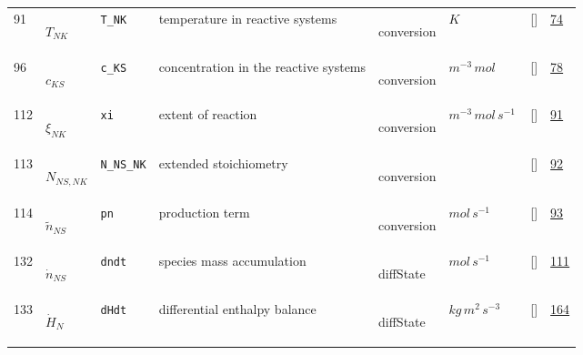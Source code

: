 \begin{longtable}{|p{1cm}|p{3cm}|p{3cm}|p{7cm}|p{3.0cm}|p{3cm}|p{2cm}|p{1cm}|}
                 \\
    91
             & \hypertarget{"v:91"}{ $ {T}_{{N K}} $}
             & \verb|T_NK|
             & temperature in reactive systems
             & \begin{lay}conversion \end{lay}
             & $ K \, $
             & []
             & \hyperlink{"e:74"}{ 74 }
                 \\
    96
             & \hypertarget{"v:96"}{ $ {c}_{{K S}} $}
             & \verb|c_KS|
             & concentration in the reactive systems
             & \begin{lay}conversion \end{lay}
             & $ m^{-3} \,mol \, $
             & []
             & \hyperlink{"e:78"}{ 78 }
                 \\
    112
             & \hypertarget{"v:112"}{ $ {\xi}_{{N K}} $}
             & \verb|xi|
             & extent of reaction
             & \begin{lay}conversion \end{lay}
             & $ m^{-3} \,mol \,s^{-1} \, $
             & []
             & \hyperlink{"e:91"}{ 91 }
                 \\
    113
             & \hypertarget{"v:113"}{ $ {N}_{{N S}, {N K}} $}
             & \verb|N_NS_NK|
             & extended stoichiometry
             & \begin{lay}conversion \end{lay}
             & $  $
             & []
             & \hyperlink{"e:92"}{ 92 }
                 \\
    114
             & \hypertarget{"v:114"}{ $ {\tilde{n}}_{{N S}} $}
             & \verb|pn|
             & production term
             & \begin{lay}conversion \end{lay}
             & $ mol \,s^{-1} \, $
             & []
             & \hyperlink{"e:93"}{ 93 }
                 \\
    132
             & \hypertarget{"v:132"}{ $ {\dot{n}}_{{N S}} $}
             & \verb|dndt|
             & species mass accumulation
             & \begin{lay}diffState \end{lay}
             & $ mol \,s^{-1} \, $
             & []
             & \hyperlink{"e:111"}{ 111 }
                 \\
    133
             & \hypertarget{"v:133"}{ $ {\dot{H}}_{N} $}
             & \verb|dHdt|
             & differential enthalpy balance
             & \begin{lay}diffState \end{lay}
             & $ kg \,m^{2} \,s^{-3} \, $
             & []
             & \hyperlink{"e:164"}{ 164 }
                 \\
    \end{longtable}